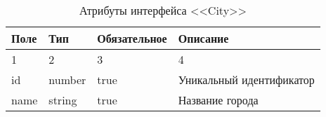 \begin{xltabular}{\textwidth}{|l|l|p{1.7cm}|X|}
    \caption{Атрибуты интерфейса <<City>>}\\ \hline
    Поле & Тип & Обяза\-тельное & Описание \\  & 2 & 3 & 4 \\ \hline
    id & number & true & Уникальный идентификатор \\ \hline
    name & string & true & Название города \\ \hline
\end{xltabular}

